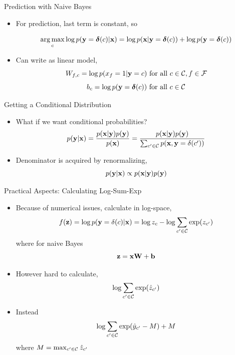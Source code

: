 \documentclass{beamer}
\begin{document}
\begin{frame}{Prediction with Naive Bayes}
  \begin{itemize}
  \item  For prediction, last term is constant, so 
  
  \[ \argmax_c \log p(\boldy =\bolddelta(c) | \boldx) = \log p(\boldx | \boldy=\bolddelta(c)) + \log p(\boldy=\bolddelta(c))  \] 

   \item  Can write as linear model,
     \[ W_{f, c} =  \log p(x_f = 1 | \mathbf{y}=c)  \mathrm{\ for\ all\  }c\in \mathcal{C}, f\in\mathcal{F} \] 
     \[ b_c = \log p(\mathbf{y}=\boldsymbol{\delta}(c))  \mathrm{\ for\ all\  }c\in \mathcal{C} \] 
   \end{itemize}
\end{frame}


\begin{frame}{Getting a Conditional Distribution}
  \begin{itemize}
  \item 

  What if we want conditional probabilities? 
  \[  p(\mathbf{y} | \mathbf{x}) = \frac{ p(\mathbf{x} | \mathbf{y})  p(\mathbf{y})}{ p(\mathbf{x})} = \frac{ p(\mathbf{x} | \mathbf{y})  p(\mathbf{y})}{ \sum_{c' \in \mathcal{C}} p(\mathbf{x}, \mathbf{y}=\delta(c'))} \] 

  \item Denominator is acquired by renormalizing,
  \[  p(\mathbf{y} | \mathbf{x}) \propto p(\mathbf{x} | \mathbf{y})  p(\mathbf{y})  \] 

  \end{itemize}
\end{frame}

\begin{frame}{Practical Aspects: Calculating Log-Sum-Exp}


  \begin{itemize}

  \item  Because of numerical issues, calculate in log-space,
  \[  f(\mathbf{z}) =  \log p(\mathbf{y}=\delta(c) | \mathbf{x}) = \log z_c  - \log \sum_{c' \in \mathcal{C}} \exp(z_{c'})  \] 
  where for naive Bayes
  \[ \mathbf{z} = \mathbf{x} \mathbf{W} + \mathbf{b}\] 
  \end{itemize}
  \pause
  
  \begin{itemize}
  \item However hard to calculate, \[\log \sum_{c' \in \mathcal{C}} \exp(\hat{z}_{c'})\]
  \item Instead 
    \[\log \sum_{c' \in \mathcal{C}} \exp(\hat{y}_{c'} - M) + M\] where $M = \max_{c'\in\mathcal{C}} \hat{z}_{c'}$ 
  \end{itemize}
\end{frame}
\end{document}

